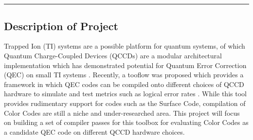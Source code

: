
\appendix
\chapter{}
\label{appendix:A}

\newcommand{\maintitle}[1]{%
        \noindent{\Large\textbf{#1}}
        \vspace{0.2cm}
        \hrule
        \vspace{0.5cm}
}

\maintitle{PROJECT PROPOSAL}


\section{Description of Project}
Trapped Ion (TI) systems are a possible platform for quantum systems, of which Quantum Charge-Coupled Devices (QCCDs) are a modular architectural implementation which has demonstrated potential for Quantum Error Correction (QEC) on small TI systems \cite{ryananderson2021realizationrealtimefaulttolerantquantum}. Recently, a tooflow was proposed which provides a framework in which QEC codes can be compiled onto different choices of QCCD hardware to simulate and test metrics such as logical error rates \cite{scottPaper}. While this tool provides rudimentary support for codes such as the Surface Code, compilation of Color Codes are still a niche and under-researched area. This project will focus on building a set of compiler passes for this toolbox for evaluating Color Codes as a candidate QEC code on different QCCD hardware choices.

